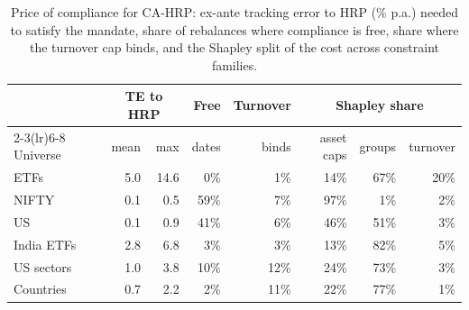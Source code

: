 \begin{table}[!htbp]\centering\small
\caption{Price of compliance for CA-HRP: ex-ante tracking error to HRP (\% p.a.) needed to satisfy the mandate, share of rebalances where compliance is free, share where the turnover cap binds, and the Shapley split of the cost across constraint families.}\label{tab:compliance}
\setlength{\tabcolsep}{4pt}\begin{tabular}{l rrrr rrr}\toprule
 & \multicolumn{2}{c}{TE to HRP} & Free & Turnover & \multicolumn{3}{c}{Shapley share}\\
\cmidrule(lr){2-3}\cmidrule(lr){6-8}
Universe & mean & max & dates & binds & asset caps & groups & turnover\\\midrule
ETFs & 5.0 & 14.6 & 0\% & 1\% & 14\% & 67\% & 20\%\\
NIFTY & 0.1 & 0.5 & 59\% & 7\% & 97\% & 1\% & 2\%\\
US & 0.1 & 0.9 & 41\% & 6\% & 46\% & 51\% & 3\%\\
India ETFs & 2.8 & 6.8 & 3\% & 3\% & 13\% & 82\% & 5\%\\
US sectors & 1.0 & 3.8 & 10\% & 12\% & 24\% & 73\% & 3\%\\
Countries & 0.7 & 2.2 & 2\% & 11\% & 22\% & 77\% & 1\%\\
\bottomrule\end{tabular}\end{table}